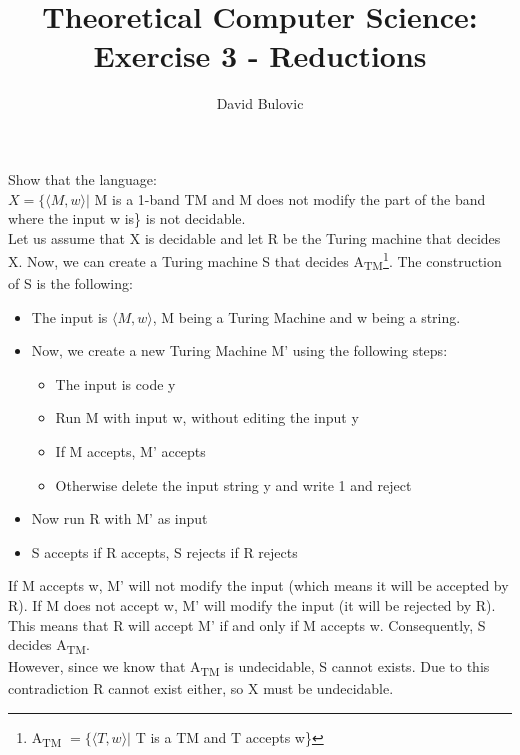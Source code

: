 \documentclass{article}
\title {Theoretical Computer Science: Exercise 3 - Reductions}
\author {David Bulovic}
\date {}
\begin{document}
\maketitle

Show that the language: \\
\begin{math} X = \{ \langle M,w \rangle | \end{math} 
M is a 1-band TM and M does not modify the part of the band where the input w is\} 
is not decidable. \\

Let us assume that X is decidable and let R be the Turing machine that decides X. Now, we can create a Turing machine 
S that decides A\textsubscript{TM}\footnote{A\textsubscript{TM} \begin{math} = \{ \langle T,w \rangle | \end{math} T is a TM and T accepts w\}}.
The construction of S is the following:
\begin{itemize}
\item The input is \begin{math}\langle M,w \rangle\end{math}, M being a Turing Machine and w being a string.
\item Now, we create a new Turing Machine M' using the following steps:
\begin{itemize}
\item The input is code y
\item Run M with input w, without editing the input y
\item If M accepts, M' accepts
\item Otherwise delete the input string y and write 1 and reject
\end{itemize}
\item Now run R with M' as input
\item S accepts if R accepts, S rejects if R rejects
\end{itemize}
If M accepts w, M' will not modify the input (which means it will be accepted by R). If M does not accept w, M' will modify the input
(it will be rejected by R). This means that R will accept M' if and only if M accepts w. Consequently, S decides A\textsubscript{TM}.\\

However, since we know that A\textsubscript{TM} is undecidable, S cannot exists. 
Due to this contradiction R cannot exist either, so X must be undecidable.
\end{document}
